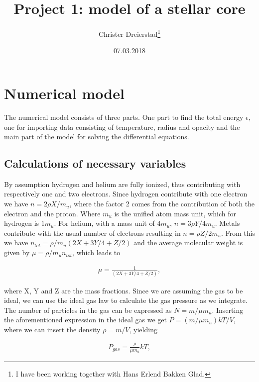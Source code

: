 \documentclass[a4paper,10pt]{article}
\title{Project 1: model of a stellar core}
\author{Christer Dreierstad\footnote{I have been working together with Hans Erlend Bakken Glad.}}
\date{07.03.2018}
\begin{document}
\maketitle




\section{Numerical model}
The numerical model consists of three parts. One part to find the total energy $\epsilon$, one for importing data consisting of temperature, radius and opacity and the main part of the model for solving the differential equations.

\subsection{Calculations of necessary variables}
By assumption hydrogen and helium are fully ionized, thus contributing with respectively one and two electrons. Since hydrogen contribute with one electron we have $n = 2\rho X/m_u$, where the factor 2 comes from the contribution of both the electron and the proton. Where $m_u$ is the unified atom mass unit, which for hydrogen is $1m_u$. For helium, with a mass unit of $4m_u$, $n = 3\rho Y/4m_u$. Metals contribute with the usual number of electrons resulting in $n = \rho Z /2m_u$. From this we have $n_{tot} = \rho/m_u(2X + 3Y/4 + Z/2)$ and the average molecular weight is given by $\mu = \rho/m_u n_{tot}$, which leads to 

\begin{align}\label{eq:mu}
\mu = \frac{1}{(2X + 3Y/4 + Z/2)},
\end{align} 

where X, Y and Z are the mass fractions. Since we are assuming the gas to be ideal, we can use the ideal gas law to calculate the gas pressure as we integrate. The number of particles in the gas can be expressed as $N = m/\mu m_u$. Inserting the aforementioned expression in the ideal gas we get $P = (m/\mu m_u)kT/V$, where we can insert the density $\rho = m/V$, yielding

\begin{align}\label{eq:pressure_gas}
P_{gas} = \frac{\rho}{\mu m_u} kT,
\end{align}
\end{document}

